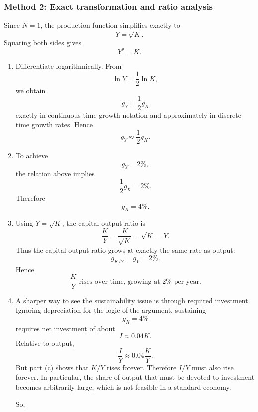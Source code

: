 \documentclass[12pt]{article}
\begin{document}
\subsubsection{Method 2: Exact transformation and ratio analysis}
Since \(N=1\), the production function simplifies exactly to
\[
Y=\sqrt{K}.
\]
Squaring both sides gives
\[
Y^2=K.
\]

\begin{enumerate}[label=(\alph*)]
    \item
    Differentiate logarithmically. From
    \[
    \ln Y=\frac{1}{2}\ln K,
    \]
    we obtain
    \[
    g_Y=\frac{1}{2}g_K
    \]
    exactly in continuous-time growth notation and approximately in discrete-time growth rates. Hence
    \[
    \boxed{g_Y\approx \frac{1}{2}g_K.}
    \]

    \item
    To achieve
    \[
    g_Y=2\%,
    \]
    the relation above implies
    \[
    \frac{1}{2}g_K=2\%.
    \]
    Therefore
    \[
    \boxed{g_K=4\%.}
    \]

    \item
    Using \(Y=\sqrt{K}\), the capital-output ratio is
    \[
    \frac{K}{Y}=\frac{K}{\sqrt{K}}=\sqrt{K}=Y.
    \]
    Thus the capital-output ratio grows at exactly the same rate as output:
    \[
    g_{K/Y}=g_Y=2\%.
    \]
    Hence
    \[
    \boxed{\frac{K}{Y}\text{ rises over time, growing at }2\%\text{ per year.}}
    \]

    \item
    A sharper way to see the sustainability issue is through required investment. Ignoring depreciation for the logic of the argument, sustaining
    \[
    g_K=4\%
    \]
    requires net investment of about
    \[
    I \approx 0.04K.
    \]
    Relative to output,
    \[
    \frac{I}{Y}\approx 0.04\frac{K}{Y}.
    \]
    But part (c) shows that \(K/Y\) rises forever. Therefore \(I/Y\) must also rise forever. In particular, the share of output that must be devoted to investment becomes arbitrarily large, which is not feasible in a standard economy.

    So,
    \begin{center}
    \end{center}
\end{enumerate}

\newpage
\end{document}

